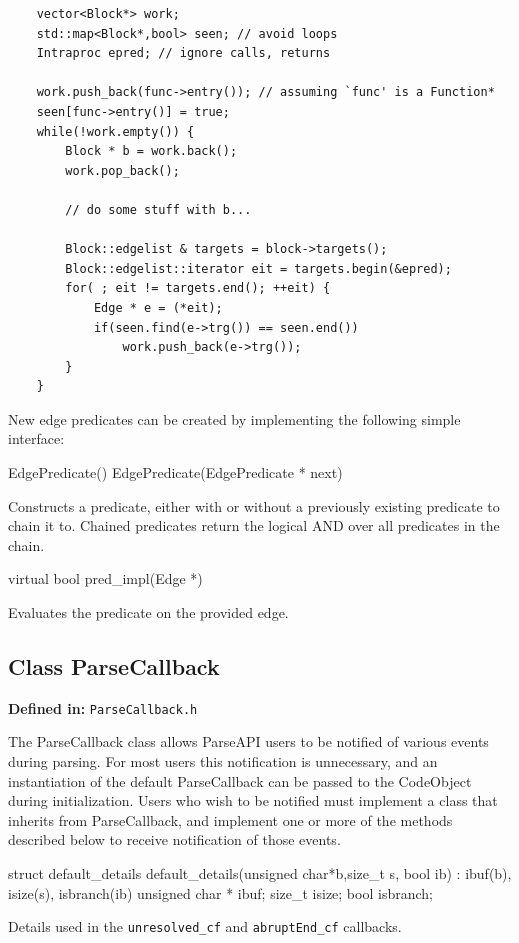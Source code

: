 \documentclass{article}
\newenvironment{apient}{\small\verbatim}{\endverbatim}
\newcommand{\apidesc}[1]{%
{\addtolength{\leftskip}{4em}%
#1\par\medskip}
}
\newcommand{\definedin}[1]{%
\textbf{Defined in:} \texttt{#1}
}
\begin{document}
\lstset{numbers=left, numberstyle=\tiny, stepnumber=5, numbersep=5pt}
\begin{lstlisting}
    vector<Block*> work;
    std::map<Block*,bool> seen; // avoid loops
    Intraproc epred; // ignore calls, returns
   
    work.push_back(func->entry()); // assuming `func' is a Function*
    seen[func->entry()] = true;
    while(!work.empty()) {
        Block * b = work.back();
        work.pop_back();

        // do some stuff with b...
   
        Block::edgelist & targets = block->targets();
        Block::edgelist::iterator eit = targets.begin(&epred);
        for( ; eit != targets.end(); ++eit) {
            Edge * e = (*eit);
            if(seen.find(e->trg()) == seen.end())
                work.push_back(e->trg());
        }
    } 
\end{lstlisting}

New edge predicates can be created by implementing the following simple interface:

\begin{apient}
EdgePredicate()
EdgePredicate(EdgePredicate * next)
\end{apient}
\apidesc{Constructs a predicate, either with or without a previously existing predicate to chain it to. Chained predicates return the logical AND over all predicates in the chain.}

\begin{apient}
virtual bool pred_impl(Edge *)
\end{apient}
\apidesc{Evaluates the predicate on the provided edge.}

\subsection{Class ParseCallback}

\definedin{ParseCallback.h}

The ParseCallback class allows ParseAPI users to be notified of various events
during parsing. For most users this notification is unnecessary, and an
instantiation of the default ParseCallback can be passed to the CodeObject during initialization. Users who wish to be notified must implement a class that inherits from ParseCallback, and implement one or more of the methods described below to receive notification of those events.

\begin{apient}
struct default_details {
    default_details(unsigned char*b,size_t s, bool ib) : ibuf(b), isize(s), isbranch(ib) { }
    unsigned char * ibuf;
    size_t isize;
    bool isbranch;
}
\end{apient}
\apidesc{Details used in the \texttt{unresolved\_cf} and \texttt{abruptEnd\_cf}
callbacks.}
\end{document}
